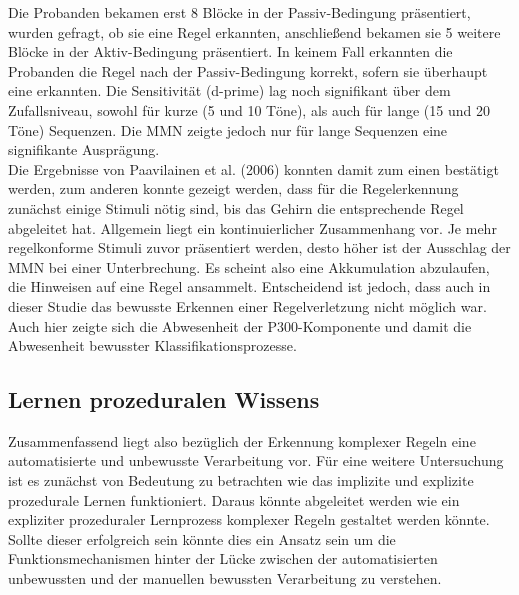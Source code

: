 \documentclass[doc,a4paper,12pt]{apa6}
\begin{document}
Die Probanden bekamen erst 8 Blöcke in der Passiv-Bedingung präsentiert, wurden gefragt, ob sie eine Regel erkannten, anschließend bekamen sie 5 weitere Blöcke in der Aktiv-Bedingung präsentiert. In keinem Fall erkannten die Probanden die Regel nach der Passiv-Bedingung korrekt, sofern sie überhaupt eine erkannten. Die Sensitivität (d-prime) lag noch signifikant über dem Zufallsniveau, sowohl für kurze (5 und 10 Töne), als auch für lange (15 und 20 Töne) Sequenzen. Die MMN zeigte jedoch nur für lange Sequenzen eine signifikante Ausprägung.\\
Die Ergebnisse von Paavilainen et al. (2006) konnten damit zum einen bestätigt werden, zum anderen konnte gezeigt werden, dass für die Regelerkennung zunächst einige Stimuli nötig sind, bis das Gehirn die entsprechende Regel abgeleitet hat. Allgemein liegt ein kontinuierlicher Zusammenhang vor. Je mehr regelkonforme Stimuli zuvor präsentiert werden, desto höher ist der Ausschlag der MMN bei einer Unterbrechung. Es scheint also eine Akkumulation abzulaufen, die Hinweisen auf eine Regel ansammelt. Entscheidend ist jedoch, dass auch in dieser Studie das bewusste Erkennen einer Regelverletzung nicht möglich war. Auch hier zeigte sich die Abwesenheit der P300-Komponente und damit die Abwesenheit bewusster Klassifikationsprozesse.


\subsection{Lernen prozeduralen Wissens}

Zusammenfassend liegt also bezüglich der Erkennung komplexer Regeln eine automatisierte und unbewusste Verarbeitung vor. Für eine weitere Untersuchung ist es zunächst von Bedeutung zu betrachten wie das implizite und explizite prozedurale Lernen funktioniert. Daraus könnte abgeleitet werden wie ein expliziter prozeduraler Lernprozess komplexer Regeln gestaltet werden könnte. Sollte dieser erfolgreich sein könnte dies ein Ansatz sein um die Funktionsmechanismen hinter der Lücke zwischen der automatisierten unbewussten und der manuellen bewussten Verarbeitung zu verstehen.
\end{document}
